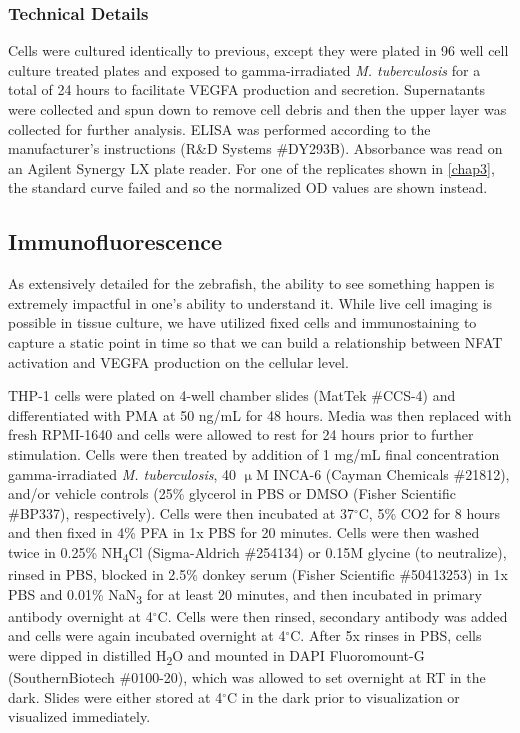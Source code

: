 \subsubsection{Technical Details}\label{howelisa}

Cells were cultured identically to previous, except they were plated in 96 well cell culture treated plates and exposed to gamma\hyp{}irradiated \textit{M. tuberculosis} for a total of 24 hours to facilitate VEGFA production and secretion. Supernatants were collected and spun down to remove cell debris and then the upper layer was collected for further analysis. ELISA was performed according to the manufacturer's instructions (R\&D Systems \#DY293B). Absorbance was read on an Agilent Synergy LX plate reader. For one of the replicates shown in \autoref{chap3}, the standard curve failed and so the normalized OD values are shown instead.

\subsection{Immunofluorescence}\label{immunofluorescence}

As extensively detailed for the zebrafish, the ability to see something happen is extremely impactful in one's ability to understand it. While live cell imaging is possible in tissue culture, we have utilized fixed cells and immunostaining to capture a static point in time so that we can build a relationship between NFAT activation and VEGFA production on the cellular level. 

THP\hyp{}1 cells were plated on 4\hyp{}well chamber slides (MatTek \#CCS\hyp{}4) and differentiated with PMA at 50 ng/mL for 48 hours. Media was then replaced with fresh RPMI\hyp{}1640 and cells were allowed to rest for 24 hours prior to further stimulation. Cells were then treated by addition of 1 mg/mL final concentration gamma\hyp{}irradiated \textit{M. tuberculosis}, 40 $\upmu$M INCA\hyp{}6 (Cayman Chemicals \#21812), and/or vehicle controls (25\% glycerol in PBS or DMSO (Fisher Scientific \#BP337), respectively). Cells were then incubated at 37$^{\circ}$C, 5\% CO2 for 8 hours and then fixed in 4\% PFA in 1x PBS for 20 minutes. Cells were then washed twice in 0.25\% NH\textsubscript{4}Cl (Sigma\hyp{}Aldrich \#254134) or 0.15M glycine (to neutralize), rinsed in PBS, blocked in 2.5\% donkey serum (Fisher Scientific \#50413253) in 1x PBS and 0.01\% NaN\textsubscript{3} for at least 20 minutes, and then incubated in primary antibody overnight at 4$^{\circ}$C. Cells were then rinsed, secondary antibody was added and cells were again incubated overnight at 4$^{\circ}$C. After 5x rinses in PBS, cells were dipped in distilled H\textsubscript{2}O and mounted in DAPI Fluoromount\hyp{}G (SouthernBiotech \#0100\hyp{}20), which was allowed to set overnight at RT in the dark. Slides were either stored at 4$^{\circ}$C in the dark prior to visualization or visualized immediately. 

